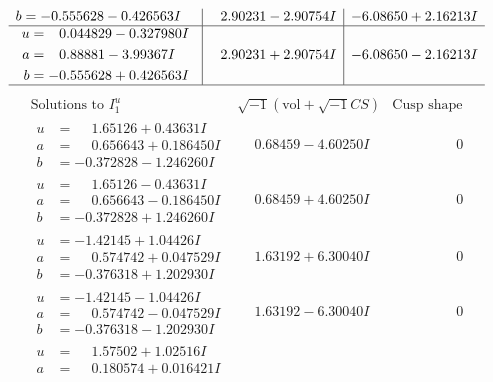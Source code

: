 \documentclass[1p]{elsarticle_modified}
\theoremstyle{definition}
\newcommand{\I}{\sqrt{-1}}
\begin{document}
$$\begin{array}{c|c|c}
\begin{aligned}
b &= -0.555628 - 0.426563 I\end{aligned}
 & \phantom{-}2.90231 - 2.90754 I & -6.08650 + 2.16213 I \\ \hline\begin{aligned}
u &= \phantom{-}0.044829 - 0.327980 I \\
a &= \phantom{-}0.88881 - 3.99367 I \\
b &= -0.555628 + 0.426563 I\end{aligned}
 & \phantom{-}2.90231 + 2.90754 I & -6.08650 - 2.16213 I\\
 \hline 
 \end{array}$$\newpage$$\begin{array}{c|c|c}  
\text{Solutions to }I^u_{1}& \I (\text{vol} + \sqrt{-1}CS) & \text{Cusp shape}\\
 \hline 
\begin{aligned}
u &= \phantom{-}1.65126 + 0.43631 I \\
a &= \phantom{-}0.656643 + 0.186450 I \\
b &= -0.372828 - 1.246260 I\end{aligned}
 & \phantom{-}0.68459 - 4.60250 I & \phantom{-0.000000 } 0 \\ \hline\begin{aligned}
u &= \phantom{-}1.65126 - 0.43631 I \\
a &= \phantom{-}0.656643 - 0.186450 I \\
b &= -0.372828 + 1.246260 I\end{aligned}
 & \phantom{-}0.68459 + 4.60250 I & \phantom{-0.000000 } 0 \\ \hline\begin{aligned}
u &= -1.42145 + 1.04426 I \\
a &= \phantom{-}0.574742 + 0.047529 I \\
b &= -0.376318 + 1.202930 I\end{aligned}
 & \phantom{-}1.63192 + 6.30040 I & \phantom{-0.000000 } 0 \\ \hline\begin{aligned}
u &= -1.42145 - 1.04426 I \\
a &= \phantom{-}0.574742 - 0.047529 I \\
b &= -0.376318 - 1.202930 I\end{aligned}
 & \phantom{-}1.63192 - 6.30040 I & \phantom{-0.000000 } 0 \\ \hline\begin{aligned}
u &= \phantom{-}1.57502 + 1.02516 I \\
a &= \phantom{-}0.180574 + 0.016421 I \\

\end{aligned}
\end{array}$$
\end{document}
